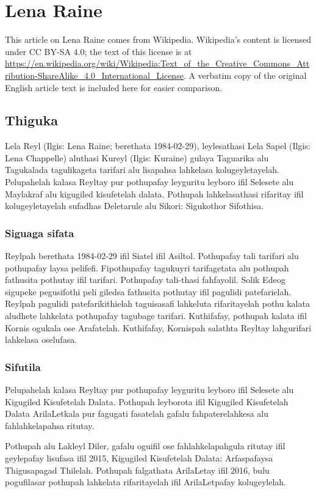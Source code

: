 \chapter{Lena Raine}
This article on Lena Raine comes from Wikipedia. Wikipedia's content is licensed under CC BY-SA 4.0; the text of this license is at \url{https://en.wikipedia.org/wiki/Wikipedia:Text_of_the_Creative_Commons_Attribution-ShareAlike_4.0_International_License}. A verbatim copy of the original English article text is included here for easier comparison.

\section{Thiguka}
Lela Reyl (Ilgis: Lena Raine; berethata 1984-02-29), leylesathasi Lela Sapel (Ilgis: Lena Chappelle) aluthasi Kureyl (Ilgis: Kuraine) gulaya Taguarika alu Tagukalada tagulikageta tarifari alu lisapahsa lahkelasa kolugeyletayelah.
Pelupahelah kalasa Reyltay pur pothupafay leyguritu leyboro ifil Selesete alu Maylakraf alu kigugiled kisufetelah dalata.
Pothupah lahkelasathasi rifaritay ifil kolugeyletayelah sufadhas Deletarule alu Sikori: Sigukothor Sifothisa. 

\subsection{Siguaga sifata}
Reylpah berethata 1984-02-29 ifil Siatel ifil Asiltol.
Pothupafay tali tarifari alu pothupafay laysa pelifefi.
Fipothupafay tagukuyri tarifagetata alu pothupah fathusita pothutay ifil tarifari.
Pothupafay tali-thasi fahfayolil.
Solik Edeog sigupeke pegusifothi peli giledsa fathusita pothutay ifil pagulidi patefarielah.
Reylpah pagulidi patefarikithielah taguisasafi lahkeluta rifaritayelah pothu kalata aludhete lahkelata pothupafay tagubage tarifari.
Kuthifafay, pothupah kalata ifil Kornis ogukala ose Arafatelah.
Kuthifafay, Kornispah salathta Reyltay lahgurifari lahkelasa oselufasa.

\subsection{Sifutila}
Pelupahelah kalasa Reyltay pur pothupafay leyguritu leyboro ifil Selesete alu Kigugiled Kisufetelah Dalata. 
Pothupah leyborota ifil Kigugiled Kisufetelah Dalata ArilaLetkala pur fagugati fasatelah gafalu fahpaterelahkesa alu fahlahkelapahsa ritutay.

Pothupah alu Lakleyl Diler, gafalu oguifil ose fahlahkelapahgula ritutay ifil geylepafay lisufasa ifil 2015, Kigugiled Kisufetelah Dalata: Arfaspafaysa Thigusapagad Thilelah.
Pothupah falgathata ArilaLetay ifil 2016, bulu pogufilasar pothupah lahkelata rifaritayelah ifil ArilaLetpafay kolugeylelah.

